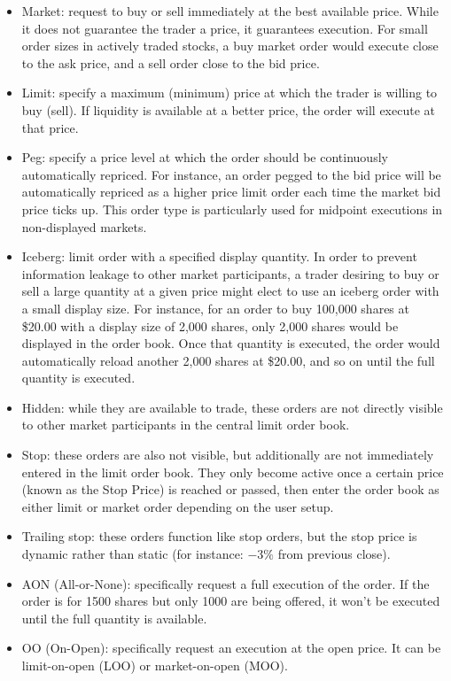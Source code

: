 \begin{itemize}
\item  Market: request to buy or sell immediately at the best available price. While it does not guarantee the trader a price, it guarantees execution. For small order sizes in actively traded stocks, a buy market order would execute close to the ask price, and a sell order close to the bid price.
\item  Limit: specify a maximum (minimum) price at which the trader is willing to buy (sell). If liquidity is available at a better price, the order will execute at that price.
\item  Peg: specify a price level at which the order should be continuously automatically repriced. For instance, an order pegged to the bid price will be automatically repriced as a higher price limit order each time the market bid price ticks up. This order type is particularly used for midpoint executions in non-displayed markets.
\item  Iceberg: limit order with a specified display quantity. In order to prevent information leakage to other market participants, a trader desiring to buy or sell a large quantity at a given price might elect to use an iceberg order with a small display size. For instance, for an order to buy 100,000 shares at \$20.00 with a display size of 2,000 shares, only 2,000 shares would be displayed in the order book. Once that quantity is executed, the order would automatically reload another 2,000 shares at \$20.00, and so on until the full quantity is executed.
\item  Hidden: while they are available to trade, these orders are not directly visible to other market participants in the central limit order book. 
\item  Stop: these orders are also not visible, but additionally are not immediately entered in the limit order book. They only become active once a certain price (known as the Stop Price) is reached or passed, then enter the order book as either limit or market order depending on the user setup.
\item  Trailing stop: these orders function like stop orders, but the stop price is dynamic rather than static (for instance: $-3\%$ from previous close).
\item  AON (All-or-None): specifically request a full execution of the order. If the order is for 1500 shares but only 1000 are being offered, it won't be executed until the full quantity is available.
\item  OO (On-Open): specifically request an execution at the open price. It can be limit-on-open (LOO) or market-on-open (MOO).

\end{itemize}
